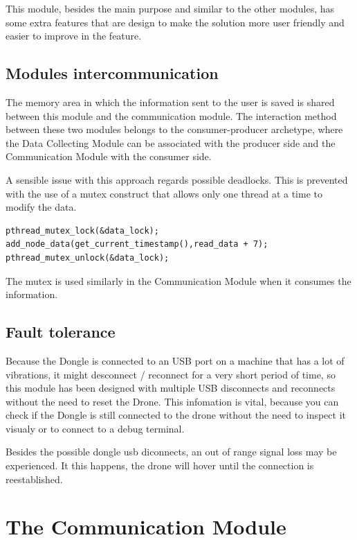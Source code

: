 This module, besides the main purpose and similar to the other modules, has some extra features that are design to make the solution more user friendly and easier to improve in the feature.

\subsection{Modules intercommunication}

The memory area in which the information sent to the user is saved is shared between this module and the communication module. The interaction method between these two modules belongs to the consumer-producer archetype, where the Data Collecting Module can be associated with the producer side and the Communication Module with the consumer side.

A sensible issue with this approach regards possible deadlocks. This is prevented with the use of a mutex construct that allows only one thread at a time to modify the data.

\lstset{numbers=none, mathescape=true, nolol=false,caption=Data Collection use of mutex,label=lst:task}
\begin{lstlisting}
pthread_mutex_lock(&data_lock);
add_node_data(get_current_timestamp(),read_data + 7);
pthread_mutex_unlock(&data_lock);
\end{lstlisting}

The mutex is used similarly in the Communication Module when it consumes the information.


\subsection{Fault tolerance}

Because the Dongle is connected to an USB port on a machine that has a lot of vibrations, it might desconnect / reconnect for a very short period of time, so this module has been designed  with multiple USB disconnects and reconnects without the need to reset the Drone. This infomation is vital, because you can check if the Dongle is still connected to the drone without the need to inspect it visualy or to connect to a debug terminal.

Besides the possible dongle usb diconnects, an out of range signal loss may be experienced. It this happens, the drone will hover until the connection is reestablished.

\section{The Communication Module}

